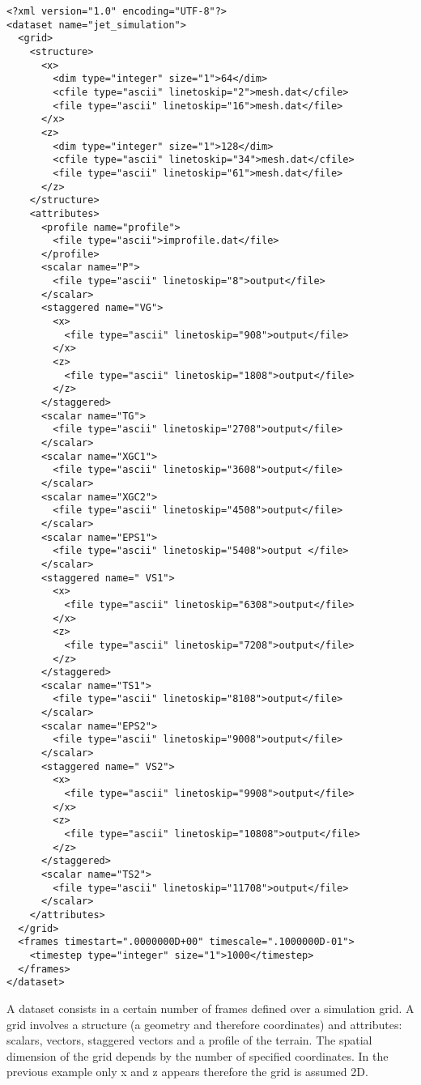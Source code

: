 \begin{verbatim}
<?xml version="1.0" encoding="UTF-8"?>
<dataset name="jet_simulation">
  <grid>
    <structure>
      <x>
        <dim type="integer" size="1">64</dim>
        <cfile type="ascii" linetoskip="2">mesh.dat</cfile>
        <file type="ascii" linetoskip="16">mesh.dat</file>
      </x>
      <z>
        <dim type="integer" size="1">128</dim>
        <cfile type="ascii" linetoskip="34">mesh.dat</cfile>
        <file type="ascii" linetoskip="61">mesh.dat</file>
      </z>
    </structure>
    <attributes>
      <profile name="profile">
        <file type="ascii">improfile.dat</file>
      </profile>
      <scalar name="P">
        <file type="ascii" linetoskip="8">output</file>
      </scalar>
      <staggered name="VG">
        <x>
          <file type="ascii" linetoskip="908">output</file>
        </x>
        <z>
          <file type="ascii" linetoskip="1808">output</file>
        </z>
      </staggered>
      <scalar name="TG">
        <file type="ascii" linetoskip="2708">output</file>
      </scalar>
      <scalar name="XGC1">
        <file type="ascii" linetoskip="3608">output</file>
      </scalar>
      <scalar name="XGC2">
        <file type="ascii" linetoskip="4508">output</file>
      </scalar>
      <scalar name="EPS1">
        <file type="ascii" linetoskip="5408">output </file>
      </scalar>
      <staggered name=" VS1">
        <x>
          <file type="ascii" linetoskip="6308">output</file>
        </x>
        <z>
          <file type="ascii" linetoskip="7208">output</file>
        </z>
      </staggered>
      <scalar name="TS1">
        <file type="ascii" linetoskip="8108">output</file>
      </scalar>
      <scalar name="EPS2">
        <file type="ascii" linetoskip="9008">output</file>
      </scalar>
      <staggered name=" VS2">
        <x>
          <file type="ascii" linetoskip="9908">output</file>
        </x>
        <z>
          <file type="ascii" linetoskip="10808">output</file>
        </z>
      </staggered>
      <scalar name="TS2">
        <file type="ascii" linetoskip="11708">output</file>
      </scalar>
    </attributes>
  </grid>
  <frames timestart=".0000000D+00" timescale=".1000000D-01">
    <timestep type="integer" size="1">1000</timestep>
  </frames>
</dataset>
\end{verbatim}

A dataset consists in a certain number of frames defined over a simulation grid. 
A grid involves a structure (a geometry and therefore coordinates) and attributes: 
scalars, vectors, staggered vectors and a profile of the terrain.
The spatial dimension of the grid depends by the number of specified coordinates. 
In the previous example only x and z appears therefore the grid is assumed 2D.



%
%
%
%
